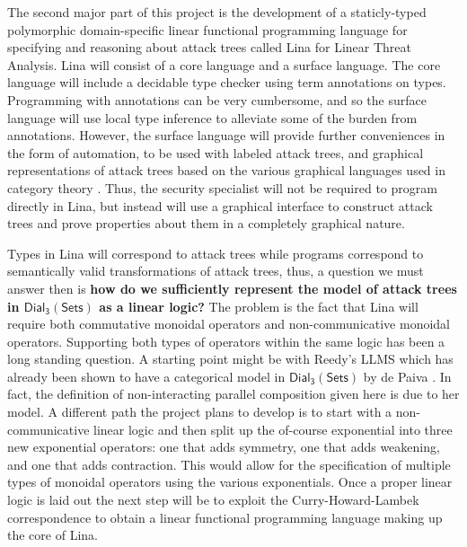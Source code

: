 \documentclass{sigplanconf}
\newcommand{\dial}[0]{\mathsf{Dial_3}(\mathsf{Sets})}
\begin{document}
The second major part of this project is the development of a
staticly-typed polymorphic domain-specific linear functional
programming language for specifying and reasoning about attack trees
called Lina for Linear Threat Analysis.  Lina will consist of a core
language and a surface language.  The core language will include a
decidable type checker using term annotations on types.  Programming
with annotations can be very cumbersome, and so the surface language
will use local type inference \cite{Pierce:2000} to alleviate some of
the burden from annotations.  However, the surface language will
provide further conveniences in the form of automation, to be used
with labeled attack trees, and graphical representations of attack
trees based on the various graphical languages used in category theory
\cite{Selinger:2009}.  Thus, the security specialist will not be
required to program directly in Lina, but instead will use a graphical
interface to construct attack trees and prove properties about them in
a completely graphical nature.  

Types in Lina will correspond to attack trees while programs
correspond to semantically valid transformations of attack trees,
thus, a question we must answer then is \textbf{how do we sufficiently
  represent the model of attack trees in $\dial$ as a linear logic?}
The problem is the fact that Lina will require both commutative
monoidal operators and non-communicative monoidal
operators. Supporting both types of operators within the same logic
has been a long standing question.  A starting point might be with
Reedy's LLMS which has already been shown to have a categorical model
in $\dial$ by de Paiva \cite{dePaiva:2014a}.  In fact, the definition
of non-interacting parallel composition given here is due to her
model.  A different path the project plans to develop is to start with
a non-communicative linear logic and then split up the of-course
exponential into three new exponential operators: one that adds
symmetry, one that adds weakening, and one that adds contraction.
This would allow for the specification of multiple types of monoidal
operators using the various exponentials.  Once a proper linear logic
is laid out the next step will be to exploit the Curry-Howard-Lambek
correspondence to obtain a linear functional programming language
making up the core of Lina.
\end{document}
